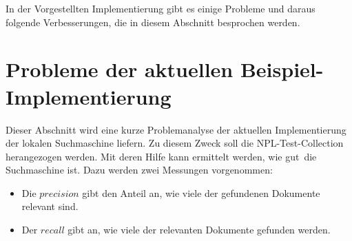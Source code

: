 In der Vorgestellten Implementierung gibt es einige Probleme und daraus folgende Verbesserungen, die in diesem Abschnitt besprochen werden.
\begin{comment}
Die folgende Liste dient nur zur Dokumentation der vorhanden Probleme und wird später durch ausführlichere Erläuterungen und Beispielen ersetzt.
\begin{itemize}
	\item BuildIndex Laufzeit verringern
	\begin{itemize}
		\item Mit Threads parallelisieren?
	\end{itemize}
	\item Invertierten Index persistieren, damit er nicht immer wieder neu aufgebaut werden muss
	\begin{itemize}
		\item Wie soll persistiert werden?
		\item Wie sollen nur Verzeichnisse mit Änderungen (Löschung/Erstellung von PDF) erkannt werden?
		\item Wann sollen Aktualisierungen durchgeführt werden?
	\end{itemize}
	\item *.dat Dateien werden als PDFs erkannt
	\item Implementierung von Stemming?
	\item RAM-Auslastung durch Speicherung der Terme der Dokumente als Liste in Document-Klasse hoch. Verlangsamt BuildINdex, beschleunigt aber Retrieve.
	\item Kontext der Wörter wird nicht beachtet (Bags of Words Modell)
	\begin{itemize}
		\item N-Gramm nutzen? (Speichern von zwei aufeinander treffende Wörter als Token)
	\end{itemize}
\end{itemize}
\end{comment}

\section{Probleme der aktuellen Beispiel-Implementierung}
Dieser Abschnitt wird eine kurze Problemanalyse der aktuellen Implementierung der lokalen Suchmaschine liefern. Zu diesem Zweck soll die NPL-Test-Collection herangezogen werden. Mit deren Hilfe kann ermittelt werden, wie \glqq gut\grqq\ die Suchmaschine ist. Dazu werden zwei Messungen vorgenommen:
\begin{itemize}
	\item Die $precision$ gibt den Anteil an, wie viele der gefundenen Dokumente relevant sind.
	\item Der $recall$ gibt an, wie viele der relevanten Dokumente gefunden werden.
\end{itemize}

